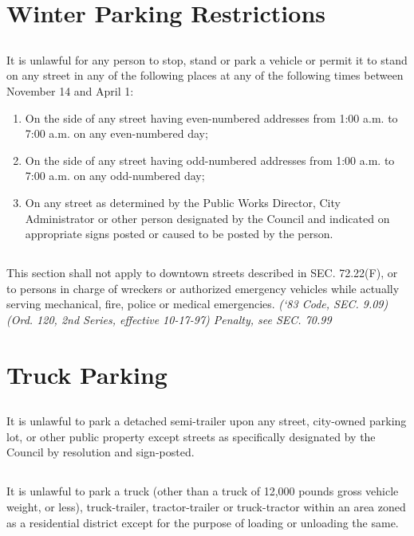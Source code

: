 \documentclass[code.tex]{subfiles}
\begin{document}
\section{Winter Parking Restrictions}
\subsection{}
It is unlawful for any person to stop, stand or park a vehicle or permit it to stand on any street in any of the following places at any of the following times between November 14 and April 1:
\begin{enumerate}[{\indent}1)]
\item On the side of any street having even-numbered addresses from 1:00 a.m. to 7:00 a.m. on any even-numbered day;
\item On the side of any street having odd-numbered addresses from 1:00 a.m. to 7:00 a.m. on any odd-numbered day;
\item On any street as determined by the Public Works Director, City Administrator or other person designated by the Council and indicated on appropriate signs posted or caused to be posted by the person.
\end{enumerate}
\subsection{}
This section shall not apply to downtown streets described in SEC. 72.22(F), or to persons in charge of wreckers or authorized emergency vehicles while actually serving mechanical, fire, police or medical emergencies.\newline
\emph{(‘83 Code, SEC. 9.09)  (Ord. 120, 2nd Series, effective 10-17-97)  Penalty, see SEC. 70.99}

\section{Truck Parking}
\subsection{}
It is unlawful to park a detached semi-trailer upon any street, city-owned parking lot, or other public property except streets as specifically designated by the Council by resolution and sign-posted.
\subsection{}
It is unlawful to park a truck (other than a truck of 12,000 pounds gross vehicle weight, or less), truck-trailer, tractor-trailer or truck-tractor within an area zoned as a residential district except for the purpose of loading or unloading the same.
\end{document}
